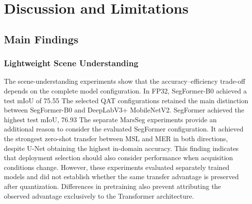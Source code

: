 \chapter{Discussion and Limitations}

\section{Main Findings}

\subsection{Lightweight Scene Understanding}

The scene-understanding experiments show that the accuracy–efficiency trade-off depends on the complete model configuration. In FP32, SegFormer-B0 achieved a test mIoU of 75.55%
The selected QAT configurations retained the main distinction between SegFormer-B0 and DeepLabV3+ MobileNetV2. SegFormer achieved the highest test mIoU, 76.93%
The separate MarsSeg experiments provide an additional reason to consider the evaluated SegFormer configuration. It achieved the strongest zero-shot transfer between MSL and MER in both directions, despite U-Net obtaining the highest in-domain accuracy. This finding indicates that deployment selection should also consider performance when acquisition conditions change. However, these experiments evaluated separately trained models and did not establish whether the same transfer advantage is preserved after quantization. Differences in pretraining also prevent attributing the observed advantage exclusively to the Transformer architecture.
